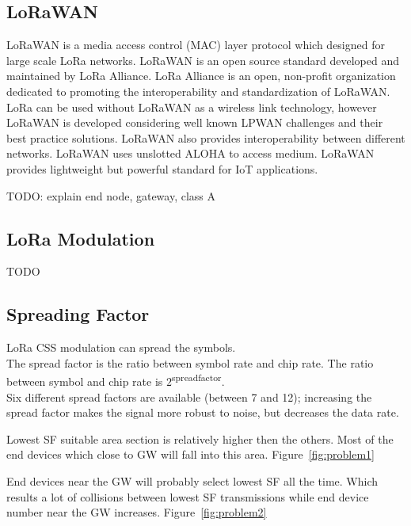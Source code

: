 \documentclass[conference]{IEEEtran}
\begin{document}
\subsection{LoRaWAN}
\par LoRaWAN is a media access control (MAC) layer protocol which designed for large scale LoRa networks. LoRaWAN is an open source standard developed and maintained by LoRa Alliance. LoRa Alliance is an open, non-profit organization dedicated to promoting the interoperability and standardization of LoRaWAN. LoRa can be used without LoRaWAN as a wireless link technology, however LoRaWAN is developed considering well known LPWAN challenges and their best practice solutions. LoRaWAN also provides interoperability between different networks. LoRaWAN uses unslotted ALOHA to access medium. LoRaWAN provides lightweight but powerful standard for IoT applications.

\par TODO: explain end node, gateway, class A

\subsection{LoRa Modulation}
\par TODO

\subsection{Spreading Factor}
\par LoRa CSS modulation can spread the symbols.\\
The spread factor is the ratio between symbol rate and chip rate. The ratio between symbol and chip rate is $2$\textsuperscript{spreadfactor}.\\
Six different spread factors are available (between 7 and 12); increasing the spread factor makes the signal more robust to noise, but decreases the data rate.\\

\par Lowest SF suitable area section is relatively higher then the others. Most of the end devices which close to GW will fall into this area. Figure~\ref{fig:problem1}

\par End devices near the GW will probably select lowest SF all the time. Which results a lot of collisions between lowest SF transmissions while end device number near the GW increases. Figure~\ref{fig:problem2}
\end{document}
